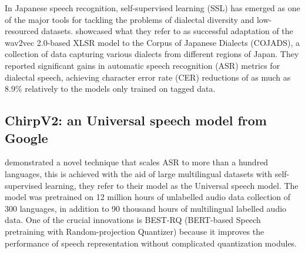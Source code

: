 In Japanese speech recognition, self-supervised learning (SSL) has emerged as one of the major tools for tackling the problems of dialectal diversity and low-resourced datasets. \textcite{miwa2023dialect} showcased what they refer to as successful adaptation of the wav2vec 2.0-based XLSR model to the Corpus of Japanese Dialects (COJADS), a collection of data capturing various dialects from different regions of Japan. They reported significant gains in automatic speech recognition (ASR) metrics for dialectal speech, achieving character error rate (CER) reductions of as much as 8.9\% relatively to the models only trained on tagged data. 


\subsection{ChirpV2: an Universal speech model from Google}
\textcite{zhang2023google} demonstrated a novel technique that scales ASR to more than a hundred languages, this is achieved with the aid of large multilingual datasets with self-supervised learning, they refer to their model as the Universal speech model. The model was pretrained on 12 million hours of unlabelled audio data collection of 300 languages, in addition to 90 thousand hours of multilingual labelled audio data. One of the crucial innovations is BEST-RQ (BERT-based Speech pretraining with Random-projection Quantizer) because it improves the performance of speech representation without complicated quantization modules. 

